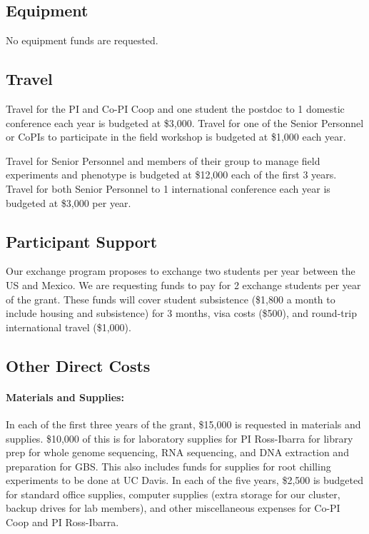 \subsection*{Equipment}

No equipment funds are requested.

\subsection*{Travel}

Travel for the PI and Co-PI Coop and one student the postdoc to 1 domestic conference each year is budgeted at \$3,000.  Travel for one of the Senior Personnel or CoPIs to participate in the field workshop is budgeted at \$1,000 each year.

Travel for Senior Personnel and members of their group to manage field experiments and phenotype is budgeted at \$12,000 each of the first 3 years. Travel for both Senior Personnel to 1 international conference each year is budgeted at \$3,000 per year.

\subsection*{Participant Support}
Our exchange program proposes to exchange two students per year between the US and Mexico.  We are requesting funds to pay for 2 exchange students per year of the grant. These funds will cover student subsistence (\$1,800 a month to include housing and subsistence) for 3 months, visa costs (\$500), and round-trip international travel (\$1,000).

\subsection*{Other Direct Costs}

 \paragraph{Materials and Supplies:}
In each of the first three years of the grant, \$15,000 is requested in materials and supplies.  \$10,000 of this is for laboratory supplies for PI Ross-Ibarra for library prep for whole genome sequencing, RNA sequencing, and DNA extraction and preparation for GBS.  This also includes funds for supplies for root chilling experiments to be done at UC Davis.  In each of the five years, \$2,500 is budgeted for standard office supplies, computer supplies (extra storage for our cluster, backup drives for lab members), and other miscellaneous expenses for Co-PI Coop and PI Ross-Ibarra. 

